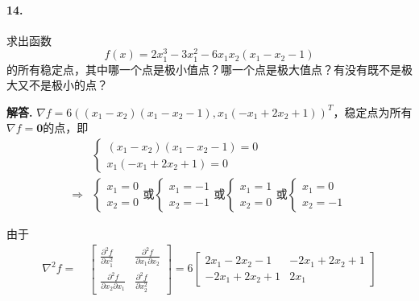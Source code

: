 \documentclass[12pt, a4paper, oneside]{ctexart}
\newenvironment{solution}{\par\noindent\textbf{解答. }}{\bigskip\par}
\begin{document}
\paragraph{14.}求出函数
\begin{equation*}
    f(x)=2x_1^3-3x_1^2-6x_1x_2(x_1-x_2-1)
\end{equation*}
的所有稳定点，其中哪一个点是极小值点？哪一个点是极大值点？有没有既不是极大又不是极小的点？
\begin{solution}
    $\nabla f = 6((x_1-x_2)(x_1-x_2-1),x_1(-x_1+2x_2+1))^T$，稳定点为所有$\nabla f=\boldsymbol{0}$的点，即
    \begin{equation*}
        \begin{aligned}
            &\begin{cases}
                (x_1-x_2)(x_1-x_2-1) = 0\\
                x_1(-x_1+2x_2+1) = 0
            \end{cases}\\
            \Rightarrow&
            \begin{cases}
                x_1 = 0\\
                x_2 = 0
            \end{cases}\text{或}
            \begin{cases}
                x_1 = -1\\
                x_2 = -1
            \end{cases}\text{或}
            \begin{cases}
                x_1 = 1\\
                x_2 = 0
            \end{cases}\text{或}
            \begin{cases}
                x_1 = 0\\
                x_2 = -1
            \end{cases}
        \end{aligned}
    \end{equation*}

    由于
    \begin{equation*}
        \begin{aligned}
            \nabla^2f =&\ \left[\begin{matrix}
                \frac{\partial^2 f}{\partial x_1^2}&\frac{\partial^2 f}{\partial x_1\partial x_2}\\
                \frac{\partial^2 f}{\partial x_2\partial x_1}&\frac{\partial^2 f}{\partial x_2^2}
            \end{matrix}\right] = 6\left[\begin{matrix}
                2x_1-2x_2-1&-2x_1+2x_2+1\\
                -2x_1+2x_2+1&2x_1
            \end{matrix}\right]
        \end{aligned}
    \end{equation*}


\end{solution}
\end{document}
